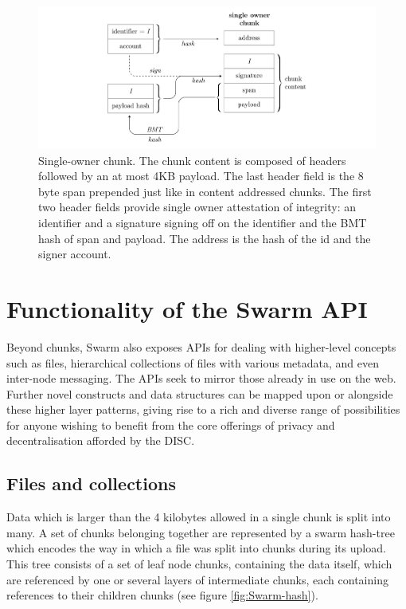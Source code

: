 \documentclass[12pt,a4paper]{article}
\begin{document}
\begin{figure}[!ht]
   \centering
   \includegraphics[width=\textwidth]{fig2/single-owner-chunk.pdf}
   \caption[Single-owner chunk]{Single-owner chunk. The chunk content is composed of headers followed by an at most 4KB payload. The last header field is the 8 byte span prepended just like in content addressed chunks. The first two header fields provide single owner attestation of integrity: an identifier and a signature signing off on the identifier and the BMT hash of span and payload. The address is the hash of the id and the signer account.}
   \label{fig:single-owner-chunks}
\end{figure}


\section{Functionality of the Swarm API}

Beyond chunks, Swarm also exposes APIs for dealing with higher-level concepts such as files, hierarchical collections of files with various metadata, and even inter-node messaging. The APIs seek to mirror those already in use on the web. Further novel constructs and data structures can be mapped upon or alongside these higher layer patterns, giving rise to a rich and diverse range of possibilities for anyone wishing to benefit from the core offerings of privacy and decentralisation afforded by the DISC.

\subsection{Files and collections}



Data which is larger than the 4 kilobytes allowed in a single chunk is split into many. A set of chunks belonging together are represented by a swarm hash-tree which encodes the way in which a file was split into chunks during its upload. This tree consists of a set of leaf node chunks, containing the data itself, which are referenced by one or several layers of intermediate chunks, each containing references to their children chunks (see figure \ref{fig:Swarm-hash}).
\end{document}
